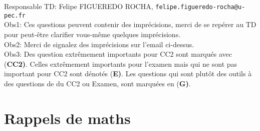 \documentclass[french,12pt]{article}
\begin{document}
Responsable TD: Felipe FIGUEREDO ROCHA, \texttt{felipe.figueredo-rocha@u-pec.fr} \\
Obs1: Ces questions peuvent contenir des imprécisions, merci de se repérer au TD pour peut-être clarifier vous-même quelques imprécisions. \\
Obs2: Merci de signalez des imprécisions sur l'email ci-dessus. \\ 
Obs3: Des question extrêmement importants pour CC2 sont marqués avec {(\bf CC2)}. Celles extrêmement importants pour l'examen mais qui ne sont pas important pour CC2 sont dénotés {(\bf E)}. Les questions qui sont plutôt des outils à des questions de du CC2 ou Examen, sont marquées en {(\bf G)}.
\section*{Rappels de maths}
\end{document}
